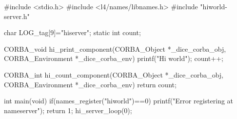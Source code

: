 #include <stdio.h>
#include <l4/names/libnames.h>
#include "hiworld-server.h"

char LOG_tag[9]="hiserver";
static int count;

CORBA_void hi_print_component(CORBA_Object *_dice_corba_obj,
                              CORBA_Environment *_dice_corba_env){
    printf("Hi world\n");
    count++;
}

CORBA_int hi_count_component(CORBA_Object *_dice_corba_obj,
                             CORBA_Environment *_dice_corba_env){
    return count;
}

int main(void){
    if(names_register("hiworld")==0){
      printf("Error registering at nameserver\n");
      return 1;
    }
    hi_server_loop(0);
}
